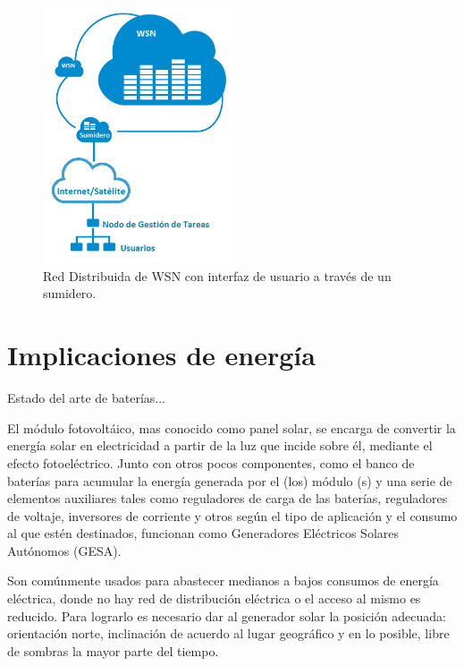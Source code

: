 \begin{figure}[h!]
	\centering
    \includegraphics[width=0.5\textwidth]{./Figures/RedDistribuida.png}
    	\caption{Red Distribuida de WSN con interfaz de usuario a través de un sumidero.}
	\label{fig:distrib}
\end{figure} 

\section{Implicaciones de energía}
\label{sec:energía}

Estado del arte de baterías...

El módulo fotovoltáico, mas conocido como panel solar, se encarga de convertir la energía solar en electricidad a partir de la luz que incide sobre él, mediante el efecto fotoeléctrico. Junto con otros pocos componentes, como el banco de baterías para acumular la energía generada por el (los) módulo (s) y una serie de elementos auxiliares tales como reguladores de carga de las baterías, reguladores de voltaje, inversores de corriente y otros según el tipo de aplicación y el consumo al que estén destinados, funcionan como Generadores Eléctricos Solares Autónomos (GESA).

Son comúnmente usados para abastecer medianos a bajos consumos de energía eléctrica, donde no hay red de distribución eléctrica o el acceso al mismo es reducido. Para lograrlo es necesario dar al generador solar la posición adecuada: orientación norte, inclinación de acuerdo al lugar geográfico y en lo posible, libre de sombras la mayor parte del tiempo.


